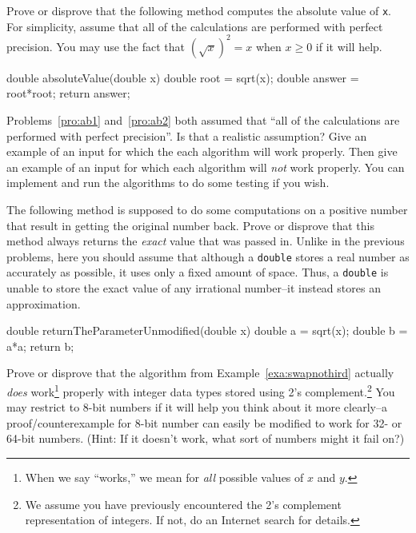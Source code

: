 \begin{pro}\label{pro:ab2}
Prove or disprove that the following method computes the absolute value of \verb+x+.
For simplicity, assume that all of the calculations are performed with perfect precision.
You may use the fact that $(\sqrt{x})^2=x$ when $x\geq 0$ if it will help.
\begin{code}
    double absoluteValue(double x) {
        double root = sqrt(x);
        double answer = root*root;
        return answer;
    }
\end{code}
\end{pro}
\begin{pro}
Problems~\ref{pro:ab1} and~\ref{pro:ab2} both assumed that 
``all of the calculations are performed with perfect precision''.  Is that a realistic assumption?
Give an example of an input for which the each algorithm will work properly.  
Then give an example of an input for which each algorithm will {\em not} work properly.
You can implement and run the algorithms to do some testing if you wish.
\end{pro}

\begin{pro}
The following method is supposed to do some computations on a positive number that result in getting the 
original number back.
Prove or disprove that this method always returns the {\em exact} value that was passed in.
Unlike in the previous problems, here you should assume that although a 
\verb+double+ stores a real number as accurately as possible, 
it uses only a fixed amount of space.  Thus, a \verb+double+ is unable to store the exact value of any
irrational number--it instead stores an approximation.
\begin{code}
    double returnTheParameterUnmodified(double x) {
        double a = sqrt(x);
        double b = a*a;
        return b;
    }
\end{code}
\end{pro}

\begin{pro}\label{pro:twoVarSwap}
Prove or disprove that the algorithm from Example~\ref{exa:swapnothird} actually {\em does} work\footnote{When we say ``works,'' we mean
for {\em all} possible values of $x$ and $y$.}
properly with integer data types stored using 2's 
complement.\footnote{We assume you have previously encountered the
2's complement representation of integers. 
If not, do an Internet search for details.}
You may restrict to 8-bit numbers
if it will help you think about it more clearly--a proof/counterexample for 8-bit number can easily
be modified to work for 32- or 64-bit numbers.
(Hint:  If it doesn't work, what sort of numbers might it fail on?)
\end{pro}

